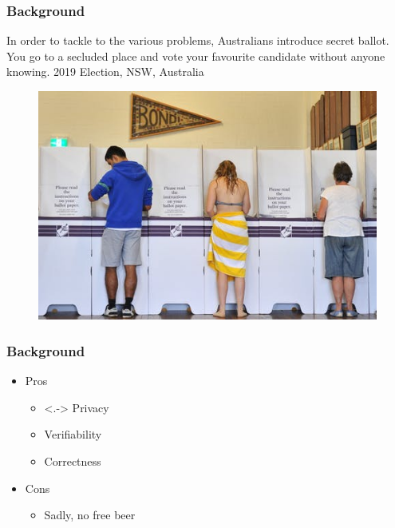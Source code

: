 \documentclass{beamer}
\begin{document}
 
 
   
\begin{frame}
\frametitle{Background}
{In order to tackle to the various problems, Australians introduce 
 secret ballot. You go to a secluded place and vote your favourite candidate without 
 anyone knowing. 2019 Election, NSW, Australia}
\begin{figure}
	\begin{center}
	\includegraphics[scale=0.50]{image-20160525-25209-cn3ftj.jpg}
	\end{center}
  \end{figure}   
\end{frame}


\begin{frame}
\frametitle{Background}
\begin{itemize}[]
\item Pros 
\begin{itemize}
\item<.-> Privacy 
\item Verifiability
\item Correctness
\end{itemize}
\item Cons
\begin{itemize}
\item Sadly, no free beer
\end{itemize}
\end{itemize}
\end{frame}
\end{document}
